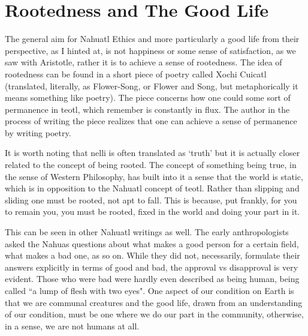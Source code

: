 \section{Rootedness and The Good Life}

The general aim for Nahuatl Ethics and more particularly a good life from their perspective, as I hinted at, is not happiness or some sense of satisfaction, as we saw with Aristotle, rather it is to achieve a sense of rootedness. The idea of rootedness can be found in a short piece of poetry called Xochi Cuicatl (translated, literally, as Flower-Song, or Flower and Song, but metaphorically it means something like poetry). The piece concerns how one could some sort of permanence in teotl,  which remember is constantly in flux. The author in the process of writing the piece realizes that one can achieve a sense of permanence by writing poetry. 

It is worth noting that nelli is often translated as `truth' but it is actually closer related to the concept of being rooted. The concept of something being true, in the sense of Western Philosophy, has built into it a sense that the world is static, which is in opposition to the Nahuatl concept of teotl. Rather than slipping and sliding one must be rooted, not apt to fall. This is because, put frankly, for you to remain you, you must be rooted, fixed in the world and doing your part in it. 

This can be seen in other Nahuatl writings as well. The early anthropologists asked the Nahuas questions about what makes a good person for a certain field, what makes a bad one, as so on. While they did not, necessarily, formulate their answers explicitly in terms of good and bad, the approval vs disapproval is very evident. Those who were bad were hardly even described as being human, being called ``a lump of flesh with two eyes".  One aspect of our condition on Earth is that we are communal creatures and the good life, drawn from an understanding of our condition, must be one where we do our part in the community, otherwise, in a sense, we are not humans at all. 

